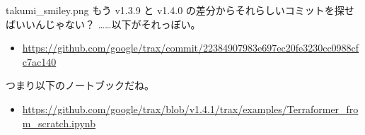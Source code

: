 \documentclass[b5paper,xelatex,ja=standard,10pt]{bxjsarticle}
\begin{document}
\begin{SERIFU}[colback=PaleGold, colbacktitle=PaleGold2]{takumi_smiley.png}
もう v1.3.9 と v1.4.0 の差分からそれらしいコミットを探せばいいんじゃない？ ……以下がそれっぽい。
\begin{itemize}
\item \url{https://github.com/google/trax/commit/22384907983e697ec20fe3230cc0988cfc7ac140}
\end{itemize}
つまり以下のノートブックだね。
\begin{itemize}
\item \url{https://github.com/google/trax/blob/v1.4.1/trax/examples/Terraformer_from_scratch.ipynb}
\end{itemize}
\end{SERIFU}


\clearpage
{}
\end{document}
